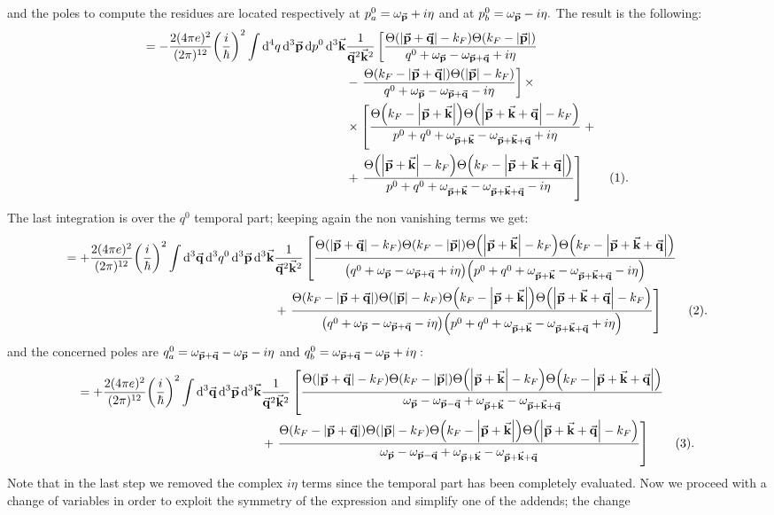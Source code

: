 \documentclass[a4paper]{article}
\newcommand{\numberthis}{\addtocounter{equation}{1}\tag{\theequation}}
\newcommand{\Ta}{\Theta\pqty{\abs{\va{p}+\va{q}}-k_F}}
\newcommand{\Taa}{\Theta\pqty{k_F - \abs{\va{p}+\va{q}}}}
\newcommand{\Tb}{\Theta\pqty{\abs{\va{p} + \va{k} + \va{q}}-k_F}}
\newcommand{\Tbb}{\Theta\pqty{k_F - \abs{\va{p} + \va{k} + \va{q}}}}
\newcommand{\Tc}{\Theta\pqty{\abs{\va{p}+\va{k}}-k_F}}
\newcommand{\Tcc}{\Theta\pqty{k_F -\abs{\va{p}+\va{k}}}}
\newcommand{\Td}{\Theta\pqty{\abs{\va{p}}-k_F}}
\newcommand{\Tdd}{\Theta\pqty{k_F -\abs{\va{p}}}}
\begin{document}
and the poles to compute the residues are located respectively at $p^0_a = \omega_{\va{p}} + i\eta$ and at $p^0_b = \omega_{\va{p}} - i\eta.$
The result is the following:
\begin{align*}
 = -\frac{2(4\pi e)^2}{(2\pi)^{12}} \pqty{\frac{i}{\hbar}}^2 \int \dd[4]{q}\dd[3]{\va{p}}\dd{p^0}\dd[3]{\va{k}}&\frac{1}{\va{q}^2 \va{k}^2}
\left[\frac{\Ta\Tdd}{q^0 +\omega_{\va{p}}-\omega_{\va{p} + \va{q}} + i\eta}\right.\\
& - \left.\frac{\Taa\Td}{q^0 +\omega_{\va{p}}-\omega_{\va{p} + \va{q}} - i\eta}\right]\times\\
&\times \left[\frac{\Tcc\Tb}{p^0+q^0+ \omega_{\va{p}+\va{k}}- \omega_{\va{p}+\va{k}+\va{q}}+i\eta} \right.+\\
&+\left. \frac{\Tc\Tbb}{p^0+q^0+ \omega_{\va{p}+\va{k}}- \omega_{\va{p}+\va{k}+\va{q}}-i\eta}\right]\numberthis .
\end{align*}
The last integration is over the $q^0$ temporal part; keeping again the non vanishing terms we get:
\begin{align*}
 = +\frac{2(4\pi e)^2}{(2\pi)^{12}} \pqty{\frac{i}{\hbar}}^2 \int \dd[3]{\va{q}}\dd[3]{q^0}\dd[3]{\va{p}}\dd[3]{\va{k}}&\frac{1}{\va{q}^2 \va{k}^2}
\left[\frac{\Ta\Tdd\Tc\Tbb}{\pqty{q^0 +\omega_{\va{p}}-\omega_{\va{p} + \va{q}} + i\eta}\pqty{p^0+q^0+ \omega_{\va{p}+\va{k}}- \omega_{\va{p}+\va{k}+\va{q}}-i\eta}}\right.\\
& + \left.\frac{\Taa\Td\Tcc\Tb}{\pqty{q^0 +\omega_{\va{p}}-\omega_{\va{p} + \va{q}} - i\eta}\pqty{{p^0+q^0+ \omega_{\va{p}+\va{k}}- \omega_{\va{p}+\va{k}+\va{q}}+i\eta}}}\right]\numberthis.
\end{align*}
and the concerned poles are $q^0_a = \omega_{\va{p}+\va{q}} -\omega_{\va{p}} -i \eta $ and $q^0_b = \omega_{\va{p}+\va{q}} -\omega_{\va{p}} +i \eta:$
\begin{align*}
= +\frac{2(4\pi e)^2}{(2\pi)^{12}} \pqty{\frac{i}{\hbar}}^2 \int \dd[3]{\va{q}}\dd[3]{\va{p}}\dd[3]{\va{k}}&\frac{1}{\va{q}^2 \va{k}^2}
\left[\frac{\Ta\Tdd\Tc\Tbb}{\omega_{\va{p}} -\omega_{\va{p}-\va{q}} +\omega_{\va{p}+\va{k}} - \omega_{\va{p}+\va{k}+ \va{q}}}\right.\\
& + \left.\frac{\Taa\Td\Tcc\Tb}{\omega_{\va{p}} -\omega_{\va{p}-\va{q}} +\omega_{\va{p}+\va{k}} - \omega_{\va{p}+\va{k}+ \va{q}}}\right]\numberthis.
\end{align*}
Note that in the last step we removed the complex $i\eta$ terms since the temporal part has been completely evaluated.
Now we proceed with a change of variables in order to exploit the symmetry of the expression and simplify one of the addends; the change
\end{document}
